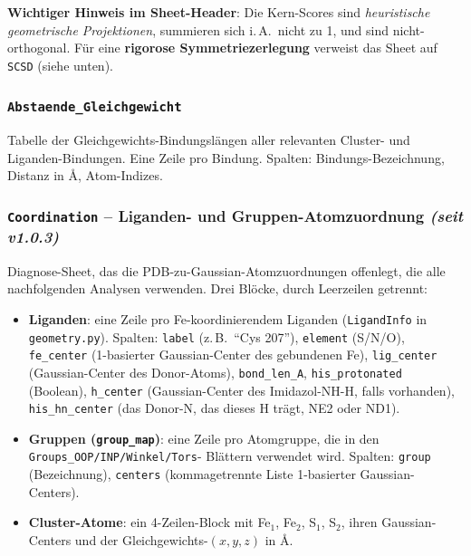 \documentclass[11pt,a4paper,twoside]{article}
\providecommand{\angstrom}{\text{\AA}}    %
\theoremstyle{remark}
\begin{document}
\textbf{Wichtiger Hinweis im Sheet-Header}: Die Kern-Scores sind
\emph{heuristische geometrische Projektionen}, summieren sich
i.\,A.\ nicht zu 1, und sind nicht-orthogonal. F\"ur eine
\textbf{rigorose Symmetriezerlegung} verweist das Sheet auf
\texttt{SCSD} (siehe unten).

\subsubsection*{\texttt{Abstaende\_Gleichgewicht}}

Tabelle der Gleichgewichts-Bindungsl\"angen aller relevanten
Cluster- und Liganden-Bindungen. Eine Zeile pro Bindung. Spalten:
Bindungs-Bezeichnung, Distanz in $\angstrom$, Atom-Indizes.

\subsubsection*{\texttt{Coordination} -- Liganden- und Gruppen-Atomzuordnung
                  \emph{(seit v1.0.3)}}
\label{app:wb-main-coordination}

Diagnose-Sheet, das die PDB-zu-Gaussian-Atomzuordnungen offenlegt, die
alle nachfolgenden Analysen verwenden. Drei Bl\"ocke, durch
Leerzeilen getrennt:
\begin{itemize}\setlength{\itemsep}{0pt}
  \item \textbf{Liganden}: eine Zeile pro Fe-koordinierendem Liganden
        (\texttt{LigandInfo} in \texttt{geometry.py}). Spalten:
        \texttt{label} (z.\,B.\ ``Cys 207''), \texttt{element}
        (S/N/O), \texttt{fe\_center} (1-basierter Gaussian-Center des
        gebundenen Fe), \texttt{lig\_center} (Gaussian-Center des
        Donor-Atoms), \texttt{bond\_len\_A},
        \texttt{his\_protonated} (Boolean), \texttt{h\_center}
        (Gaussian-Center des Imidazol-NH-H, falls vorhanden),
        \texttt{his\_hn\_center} (das Donor-N, das dieses H tr\"agt,
        NE2 oder ND1).
  \item \textbf{Gruppen (\texttt{group\_map})}: eine Zeile pro
        Atomgruppe, die in den \texttt{Groups\_OOP/INP/Winkel/Tors}-
        Bl\"attern verwendet wird. Spalten: \texttt{group}
        (Bezeichnung), \texttt{centers} (kommagetrennte Liste
        1-basierter Gaussian-Centers).
  \item \textbf{Cluster-Atome}: ein 4-Zeilen-Block mit Fe$_1$,
        Fe$_2$, S$_1$, S$_2$, ihren Gaussian-Centers und der
        Gleichgewichts-$(x, y, z)$ in $\angstrom$.
\end{itemize}
\end{document}
